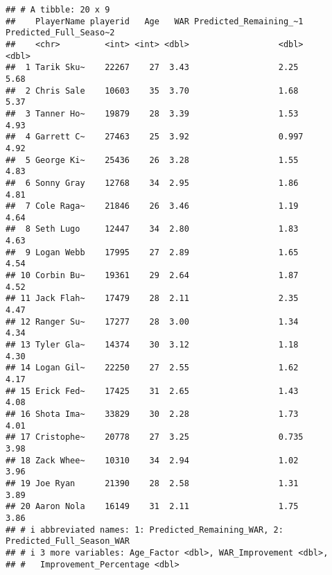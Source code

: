 \documentclass[
]{article}
\begin{document}
\begin{verbatim}
## # A tibble: 20 x 9
##    PlayerName playerid   Age   WAR Predicted_Remaining_~1 Predicted_Full_Seaso~2
##    <chr>         <int> <int> <dbl>                  <dbl>                  <dbl>
##  1 Tarik Sku~    22267    27  3.43                  2.25                    5.68
##  2 Chris Sale    10603    35  3.70                  1.68                    5.37
##  3 Tanner Ho~    19879    28  3.39                  1.53                    4.93
##  4 Garrett C~    27463    25  3.92                  0.997                   4.92
##  5 George Ki~    25436    26  3.28                  1.55                    4.83
##  6 Sonny Gray    12768    34  2.95                  1.86                    4.81
##  7 Cole Raga~    21846    26  3.46                  1.19                    4.64
##  8 Seth Lugo     12447    34  2.80                  1.83                    4.63
##  9 Logan Webb    17995    27  2.89                  1.65                    4.54
## 10 Corbin Bu~    19361    29  2.64                  1.87                    4.52
## 11 Jack Flah~    17479    28  2.11                  2.35                    4.47
## 12 Ranger Su~    17277    28  3.00                  1.34                    4.34
## 13 Tyler Gla~    14374    30  3.12                  1.18                    4.30
## 14 Logan Gil~    22250    27  2.55                  1.62                    4.17
## 15 Erick Fed~    17425    31  2.65                  1.43                    4.08
## 16 Shota Ima~    33829    30  2.28                  1.73                    4.01
## 17 Cristophe~    20778    27  3.25                  0.735                   3.98
## 18 Zack Whee~    10310    34  2.94                  1.02                    3.96
## 19 Joe Ryan      21390    28  2.58                  1.31                    3.89
## 20 Aaron Nola    16149    31  2.11                  1.75                    3.86
## # i abbreviated names: 1: Predicted_Remaining_WAR, 2: Predicted_Full_Season_WAR
## # i 3 more variables: Age_Factor <dbl>, WAR_Improvement <dbl>,
## #   Improvement_Percentage <dbl>
\end{verbatim}
\end{document}
